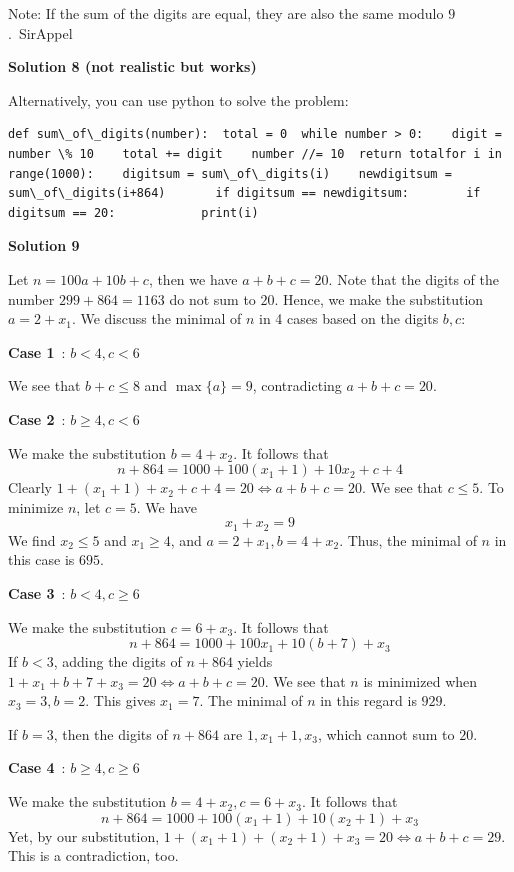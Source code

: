 \begin{enumerate}
 Note: If the sum of the digits are equal, they are also the same modulo $9$.~SirAppel

 



\textbf{Solution 8 (not realistic but works)}

Alternatively, you can use python to solve the problem:

 \begin{verbatim}
def sum\_of\_digits(number):  total = 0  while number > 0:    digit = number \% 10    total += digit    number //= 10  return totalfor i in range(1000):    digitsum = sum\_of\_digits(i)    newdigitsum = sum\_of\_digits(i+864)       if digitsum == newdigitsum:        if digitsum == 20:            print(i)
\end{verbatim}





\textbf{Solution 9}

Let $n=100a+10b+c$, then we have $a+b+c=20$. Note that the digits of the number $299+864=1163$ do not sum to $20$. Hence, we make the substitution $a=2+x_{1}$. We discuss the minimal of $n$ in 4 cases based on the digits $b,c$:

 \textbf{Case 1} : $b < 4, c < 6$

 We see that $b+c\le 8$ and  $\max{\{a\}}=9$, contradicting $a+b+c=20$. 

 \textbf{Case 2} : $b \ge 4, c < 6$

 We make the substitution $b=4+x_{2}$. It follows that
 \[n+864=1000+100(x_{1}+1)+10x_{2}+c+4\]Clearly $1+(x_{1}+1)+x_{2}+c+4=20\iff a+b+c=20$. We see that $c\le 5$. To minimize $n$, let $c=5$. We have
 \[x_{1}+x_{2}=9\]We find $x_{2}\le 5$ and $x_{1}\ge 4$, and $a=2+x_{1}, b=4+x_{2}$. Thus, the minimal of $n$ in this case is $695$.

 \textbf{Case 3} : $b < 4, c \ge 6$

 We make the substitution $c=6+x_{3}$. It follows that
 \[n+864=1000+100x_{1}+10(b+7)+x_{3}\]If $b<3$, adding the digits of $n+864$ yields $1+x_{1}+b+7+x_{3}=20\iff a+b+c=20$. We see that $n$ is minimized when $x_{3}=3, b=2$. This gives $x_{1}=7$. The minimal of $n$ in this regard is $929$.

 If $b=3$, then the digits of $n+864$ are $1, x_{1}+1, x_{3}$, which cannot sum to $20$.

 \textbf{Case 4} : $b \ge 4, c \ge 6$

 We make the substitution $b=4+x_{2}, c=6+x_{3}$. It follows that
 \[n+864=1000+100(x_{1}+1)+10(x_{2}+1)+x_{3}\]Yet, by our substitution, $1+(x_{1}+1)+(x_{2}+1)+x_{3}=20\iff a+b+c=29$. This is a contradiction, too.


\end{enumerate}

